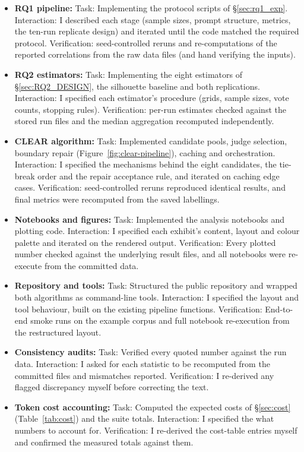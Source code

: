 \documentclass[11pt,a4paper,oneside]{report}
\begin{document}
\begin{itemize}
\item \textbf{RQ1 pipeline:} Task: Implementing the protocol scripts of \S\ref{sec:rq1_exp}.
Interaction: I described each stage (sample sizes, prompt structure, metrics,
the ten-run replicate design) and iterated until the code matched the
required protocol. Verification: seed-controlled reruns and re-computations of the
reported correlations from the raw data files (and hand verifying the inputs).
\item \textbf{RQ2 estimators:} Task: Implementing the eight estimators of \S\ref{sec:RQ2_DESIGN}, the
silhouette baseline and both replications. Interaction: I specified each
estimator's procedure (grids, sample sizes, vote counts, stopping rules).
Verification: per-run estimates checked against the stored run files and the
median aggregation recomputed independently.
\item \textbf{CLEAR algorithm:} Task: Implemented candidate pools, judge
selection, boundary repair (Figure~\ref{fig:clear-pipeline}), caching and orchestration. Interaction: I
specified the mechanisms behind the eight candidates, the tie-break order and the repair acceptance
rule, and iterated on caching edge cases. Verification: seed-controlled reruns
reproduced identical results, and final metrics were recomputed from the saved
labellings.
\item \textbf{Notebooks and figures:} Task: Implemented the analysis notebooks
and plotting code. Interaction: I specified each exhibit's content, layout
and colour palette and iterated on the rendered output. Verification: Every
plotted number checked against the underlying result files, and all notebooks were 
re-execute from the committed data.
\item \textbf{Repository and tools:} Task: Structured the public repository and
wrapped both algorithms as command-line tools. Interaction: I specified the
layout and tool behaviour, built on the existing pipeline functions.
Verification: End-to-end smoke runs on the example corpus and full notebook
re-execution from the restructured layout.
\item \textbf{Consistency audits:} Task: Verified every quoted number against
the run data. Interaction: I asked for each statistic to be recomputed from
the committed files and mismatches reported. Verification: I re-derived any
flagged discrepancy myself before correcting the text.
\item \textbf{Token cost accounting:} Task: Computed the expected costs of
\S\ref{sec:cost} (Table~\ref{tab:cost}) and the suite totals. Interaction: I specified the what numbers to account for. Verification: I re-derived the
cost-table entries myself and confirmed the measured totals against them.

\end{itemize}
\end{document}
